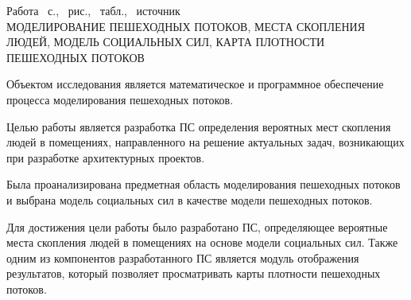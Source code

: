 \thispagestyle{empty}

\begin{center}
  Работа~\pageref*{LastPage} с., \totfig{}~рис., \tottab{}~табл., \totref{}~источник \\
  \MakeUppercase{моделирование пешеходных потоков, места скопления людей, модель социальных сил, карта плотности пешеходных потоков}
\end{center}

\vspace{1.0\parsep}

Объектом исследования является математическое и программное обеспечение процесса моделирования пешеходных потоков.

Целью работы является разработка ПС определения вероятных мест скопления людей в помещениях,
направленного на решение актуальных задач, возникающих при разработке архитектурных проектов.

Была проанализирована предметная область моделирования пешеходных потоков и выбрана модель социальных сил в качестве модели пешеходных потоков.

Для достижения цели работы было разработано ПС, определяющее вероятные места скопления людей в помещениях на основе модели социальных сил.
Также одним из компонентов разработанного ПС является модуль отображения результатов, который позволяет просматривать карты плотности пешеходных потоков.

\clearpage
